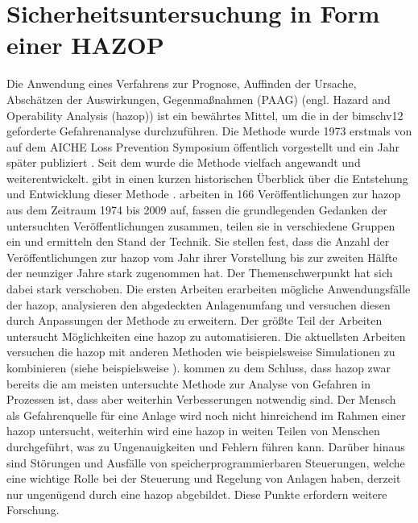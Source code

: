 \section{Sicherheitsuntersuchung in Form einer HAZOP}\label{sec:sdt_hazop}
Die Anwendung eines Verfahrens zur Prognose, Auffinden der Ursache, Absch\"atzen der Auswirkungen, Gegenma\ss{}nahmen (PAAG) (engl. Hazard and Operability Analysis (\ac{hazop})) ist ein bew\"ahrtes Mittel, um die in der \ac{bimschv12} geforderte Gefahrenanalyse durchzuf\"uhren. Die Methode wurde 1973 erstmals von \citeauthor{Lawley_1974} auf dem AICHE Loss Prevention Symposium \"offentlich vorgestellt und ein Jahr sp\"ater publiziert \cite{Lawley_1974}. Seit dem wurde die Methode vielfach angewandt und weiterentwickelt. \newline
\citeauthor{Kletz_1997} gibt in  einen kurzen historischen \"Uberblick \"uber die Entstehung und Entwicklung dieser Methode \cite{Kletz_1997}. \citeauthor{Dunjo_2010} arbeiten in  \cite{Dunjo_2010} 166 Ver\"offentlichungen zur \ac{hazop} aus dem Zeitraum 1974 bis 2009 auf, fassen die grundlegenden Gedanken der untersuchten Ver\"offentlichungen zusammen, teilen sie in verschiedene Gruppen ein und ermitteln den Stand der Technik. Sie stellen fest, dass die Anzahl der Ver\"offentlichungen zur \ac{hazop} vom Jahr ihrer Vorstellung bis zur zweiten H\"alfte der neunziger Jahre stark zugenommen hat. Der Themenschwerpunkt hat sich dabei stark verschoben. Die ersten Arbeiten erarbeiten m\"ogliche Anwendungsf\"alle der \ac{hazop}, analysieren den abgedeckten Anlagenumfang und versuchen diesen durch Anpassungen der Methode zu erweitern. Der gr\"o\ss{}te Teil der Arbeiten untersucht M\"oglichkeiten eine \ac{hazop} zu automatisieren. Die aktuellsten Arbeiten versuchen die \ac{hazop} mit anderen Methoden wie beispielsweise Simulationen zu kombinieren (siehe beispielsweise \cite{Li_2013}). \citeauthor{Dunjo_2010} kommen zu dem Schluss, dass \ac{hazop} zwar bereits die am meisten untersuchte Methode zur Analyse von Gefahren in Prozessen ist, dass aber weiterhin Verbesserungen notwendig sind. Der Mensch als Gefahrenquelle f\"ur eine Anlage wird noch nicht hinreichend im Rahmen einer \ac{hazop} untersucht, weiterhin wird eine \ac{hazop} in weiten Teilen von Menschen durchgef\"uhrt, was zu Ungenauigkeiten und Fehlern f\"uhren kann. Dar\"uber hinaus sind St\"orungen und Ausf\"alle von speicherprogrammierbaren Steuerungen, welche eine wichtige Rolle bei der Steuerung und Regelung von Anlagen haben, derzeit nur ungen\"ugend durch eine \ac{hazop} abgebildet. Diese Punkte erfordern weitere Forschung.

